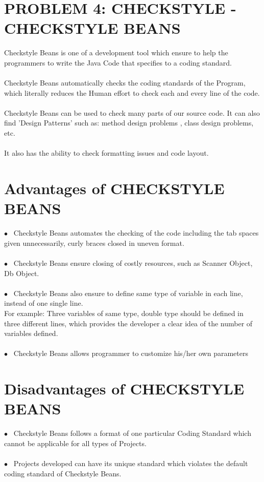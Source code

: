 \documentclass[10pt]{article}
\begin{document}
\clearpage

\section*{{PROBLEM 4: CHECKSTYLE - CHECKSTYLE BEANS}}

Checkstyle Beans is one of a development tool which ensure to help the programmers to write the Java Code that specifies to a coding standard. 
\\
\\   Checkstyle Beans automatically checks the coding standards of the Program, which literally reduces the Human effort to check each and every line of the code.
\\
\\
Checkstyle Beans  can be used to check many parts of our source code. It can also find 'Design Patterns' such as: method design problems , class design problems, etc.
\\
\\
It also has the ability to check formatting issues and code layout.
\\

\section*{\normalsize Advantages of CHECKSTYLE BEANS}

$\bullet$~ Checkstyle Beans automates the checking of the code including the tab spaces given unnecessarily, curly braces closed in uneven format.
\\
\\
$\bullet$~ Checkstyle Beans ensure closing of costly resources, such as Scanner Object, Db Object.
\\
\\
$\bullet$~ Checkstyle Beans also ensure to define same type of variable in each line, instead of one single line.\\
    
    For example: Three variables of same type, double type should be defined in three different lines, which provides the developer a clear idea of the number of variables defined.
\\
\\
$\bullet$~ Checkstyle Beans allows programmer to customize his/her own parameters 

\section*{\normalsize Disadvantages of CHECKSTYLE BEANS}
$\bullet$~ Checkstyle Beans follows a format of one particular Coding Standard which cannot be applicable for all types of Projects. 
\\
\\
$\bullet$~ Projects developed can have its unique standard which violates the default coding standard of Checkstyle Beans.
    
\end{document}
